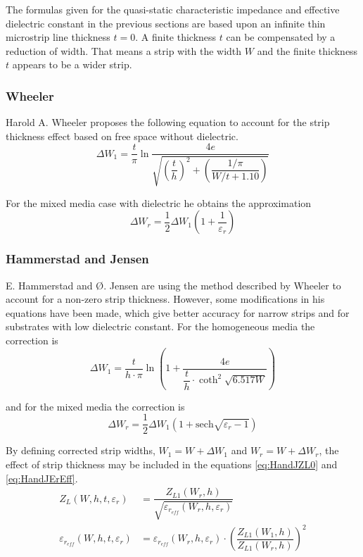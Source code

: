 \documentclass[10pt]{report}
\begin{document}
The formulas given for the quasi-static characteristic impedance and
effective dielectric constant in the previous sections are based upon
an infinite thin microstrip line thickness $t = 0$.  A finite
thickness $t$ can be compensated by a reduction of width.  That means
a strip with the width $W$ and the finite thickness $t$ appears to be
a wider strip.

\subsubsection{Wheeler}

Harold A. Wheeler \cite{Wheeler} proposes the following equation to
account for the strip thickness effect based on free space without
dielectric.
\begin{equation}
\Delta W_1 = \dfrac{t}{\pi} \ln{\dfrac{4 e}{\sqrt{\left(\dfrac{t}{h}\right)^2 + \left(\dfrac{1/\pi}{W/t + 1.10}\right)}}}
\end{equation}

For the mixed media case with dielectric he obtains the approximation
\begin{equation}
\Delta W_r = \dfrac{1}{2} \Delta W_1 \left(1 + \dfrac{1}{\varepsilon_r}\right)
\end{equation}

\subsubsection{Hammerstad and Jensen}

E. Hammerstad and {\O}. Jensen are using the method described by Wheeler
\cite{Wheeler} to account for a non-zero strip thickness.  However,
some modifications in his equations have been made, which give better
accuracy for narrow strips and for substrates with low dielectric
constant.  For the homogeneous media the correction is
\begin{equation}
\Delta W_1 = \dfrac{t}{h\cdot\pi} \ln{\left(1 + \dfrac{4e}{\dfrac{t}{h}\cdot \coth^2{\sqrt{6.517 W}}}\right)}
\end{equation}

and for the mixed media the correction is
\begin{equation}
\Delta W_r = \dfrac{1}{2} \Delta W_1 \left(1 + \text{sech} \sqrt{\varepsilon_r - 1}\right)
\end{equation}

By defining corrected strip widths, $W_1 = W + \Delta W_1$ and $W_r =
W + \Delta W_r$, the effect of strip thickness may be included in the
equations \eqref{eq:HandJZL0} and \eqref{eq:HandJErEff}.
\begin{align}
Z_L \left(W, h, t, \varepsilon_r\right) &= \dfrac{Z_{L1} \left(W_r, h\right)}{\sqrt{\varepsilon_{r_{eff}} \left(W_r, h, \varepsilon_r\right)}}\\
\varepsilon_{r_{eff}} \left(W, h, t, \varepsilon_r\right) &= \varepsilon_{r_{eff}} \left(W_r, h, \varepsilon_r\right) \cdot \left(\dfrac{Z_{L1} \left(W_1, h\right)}{Z_{L1} \left(W_r, h\right)}\right)^2
\end{align}
\end{document}
